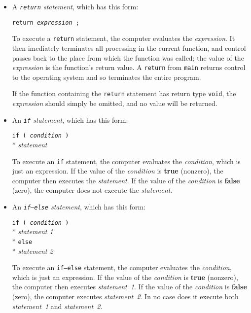 \begin{itemize}
\item A {\em {\tt return} statement}\/, which has this form:

\begin{flushleft}
{\tt return {\em expression} ; }
\end{flushleft}

To execute a {\tt return} statement, the computer evaluates the {\em
expression}\/.   It then imediately terminates all processing in the
current function, and control passes back to the place from which the
function was called; the value of the {\em expression} is the function's
return value.  A {\tt return} from {\tt main} returns control to the
operating system and so terminates the entire program.

If the function containing the {\tt return} statement has return type
{\tt void}, the {\em expression}\/ should simply be omitted, and no
value will be returned.

\item An {\em {\tt if} statement}\/, which has this form:

\begin{flushleft}
{\tt if ( {\em condition} )} \\*
{\hspace{8pt}\em statement} 
\end{flushleft}

To execute an {\tt if} statement, the computer evaluates the {\em
condition}\/, which is just an expression.  If the value of the {\em
condition} is {\bf true} (nonzero), the computer then executes the {\em
statement}.  If the value of the {\em condition} is {\bf false} (zero),
the computer does not execute the {\em statement}\/.

\item An {\em {\tt if{\rm--}else} statement}\/, which has this form:

\begin{flushleft}
{\tt if ( {\em condition} )} \\*
{\hspace{8pt}\em statement 1} \\*
{\tt else } \\*
{\hspace{8pt}\em statement 2} 
\end{flushleft}

To execute an {\tt if{\rm--}else} statement, the computer evaluates the
{\em condition}\/, which is just an expression.  If the value of the
{\em condition} is {\bf true} (nonzero), the computer then executes {\em
statement~1}.  If the value of the {\em condition} is {\bf false}
(zero), the computer executes {\em statement~2}\/.  In no case does it
execute both {\em statement~1} and {\em statement~2}.


\end{itemize}

